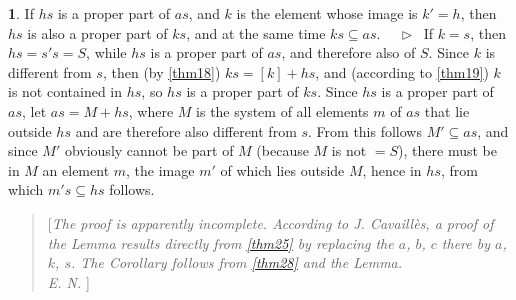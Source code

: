 \documentclass[leqno,hidelinks,10pt]{article}
\theoremstyle{definition}
\newtheorem*{hilfssatz}{\protect\hilfssatzname}
\newcommand{\hilfssatzname}{}
\renewcommand{\hilfssatzname}{Hilfssatz}%
\renewcommand{\hilfssatzname}{Lemma}%
\newcommand\Beweis{\medskip \newline $ \phantom{'.'} \rhd \ $}%
\newcommand{\partof}{\subseteq}
\newcommand{\sref}[1]{\underline{\ref{#1}}}%
\begin{document}
\begin{paracol}{2}
\begin{rightcolumn}
\begin{hilfssatz}
If $hs$ is a proper part of $as$, and $k$ is the element whose image is $k'=h$,
then $hs$ is also a proper part of $ks$, and at the same time $ks \partof as$.
\Beweis
If $k=s$, then $hs=s's= S$, while $hs$ is a proper part of $as$, and therefore
also of $S$. Since $k$ is different from $s$, then (by \sref{thm18}) $ks = [k]+ hs$,
and (according to \sref{thm19}) $k$ is not contained in $hs$, so $hs$ is a proper
part of $ks$. Since $hs$ is a proper part of $as$, let $as = M + hs$, where $M$
is the system of all elements $m$ of $as$ that lie outside $hs$ and are therefore
also different from $s$. From this follows $M' \partof as$, and since $M'$ obviously
cannot be part of $M$ (because $M$ is not $= S$), there must be in $M$ an element
$m$, the image $m'$ of which lies outside $M$, hence in $hs$, from which
$m's \partof hs$ follows.
\end{hilfssatz}

\begin{quote}
[\emph{The proof is apparently incomplete. According to J. Cavaillès, a proof of
the Lemma results directly from \sref{thm25} by replacing the $a$, $b$, $c$ there
by $a$, $k$, $s$. The Corollary follows from \sref{thm28} and the Lemma.
\ \\
E. N.
}]\end{quote}



\end{rightcolumn}
\end{paracol}
\end{document}
